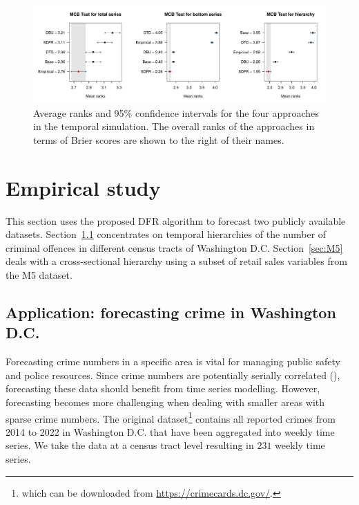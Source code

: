 \documentclass[a4paper,review,12pt,authoryear]{elsarticle}
\theoremstyle{definition}
\begin{document}
     \begin{figure}
       \caption{\label{fig:sim_temporal_mcb_prob}Average ranks and 95\% confidence intervals for the four approaches in the temporal simulation. The overall ranks of the approaches in terms of Brier scores are shown to the right of their names.}
       \includegraphics[width=\textwidth]{figures/temporal_mcb.pdf}
     \end{figure}

     \section{Empirical study}
     \label{sec:application}
     This section uses the proposed DFR algorithm to forecast two publicly available datasets.
     Section~\ref{sec:application_crime} concentrates on temporal hierarchies of the number of criminal offences in different census tracts of Washington D.C.
     Section~\ref{sec:M5} deals with a cross-sectional hierarchy using a subset of retail sales variables from the M5 dataset.

     \subsection{Application: forecasting crime in Washington D.C.}
     \label{sec:application_crime}

     Forecasting crime numbers in a specific area is vital for managing public safety and police resources. Since crime numbers are potentially serially correlated (\citealp{aldor-noimanSpatioTemporalLowCount2013}), forecasting these data should benefit from time series modelling.
     However, forecasting becomes more challenging when dealing with smaller areas with sparse crime numbers.
     The original dataset\footnote{which can be downloaded from \url{https://crimecards.dc.gov/}.} contains all reported crimes from 2014 to 2022 in Washington D.C. that have been aggregated into weekly time series. We take the data at a census tract level resulting in $231$ weekly time series. 
\end{document}
